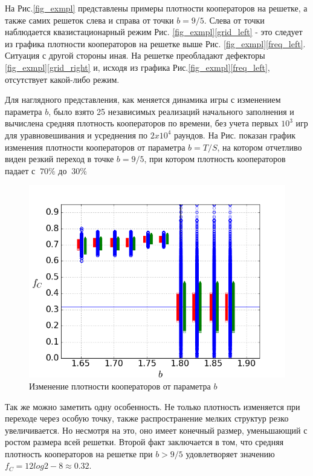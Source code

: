 \documentclass[12pt,a4paper]{article}
\begin{document}
	\par На Рис.\ref{fig_exmpl} представлены примеры плотности кооператоров на решетке, а также самих решеток слева и справа от точки $b=9/5$. Слева от точки наблюдается квазистационарный режим Рис. \ref{fig_exmpl}\ref{grid_left} - это следует из графика плотности кооператоров на решетке выше Рис. \ref{fig_exmpl}\ref{freq_left}. Ситуация с другой стороны иная. На решетке преобладают дефекторы \ref{fig_exmpl}\ref{grid_right} и, исходя из графика Рис.\ref{fig_exmpl}\ref{freq_left}, отсутствует какой-либо режим.
		
	\par Для наглядного представления, как меняется динамика игры с изменением параметра $b$, было взято 25 независимых реализаций начального заполнения и вычислена средняя плотность кооператоров по времени, без учета первых $10^{3}$ игр для уравновешивания и усреднения по $2 x 10^{4}$ раундов. На Рис. показан график изменения плотности кооператоров от параметра $b=T/S$, на котором отчетливо виден резкий переход в точке $b=9/5$, при котором плотность кооператоров падает с $~70\% $ до $~30\%$
	
	\begin{figure}[H]
		\label{freq}
		\centering
		\includegraphics[width=0.7\linewidth]{fig1_1.png}
		\caption{Изменение плотности кооператоров от параметра $b$}
	\end{figure}
	
	
	\par Так же можно заметить одну особенность. Не только плотность изменяется при  переходе через особую точку, также распространение мелких структур резко увеличивается. Но несмотря на это, оно имеет конечный размер, уменьшающий с ростом размера всей решетки. Второй факт заключается в том, что средняя плотность кооператоров на решетке при $b>9/5$ удовлетворяет значению $ f_{C} = 12log2-8 \approx 0.32$.
	
\end{document}
